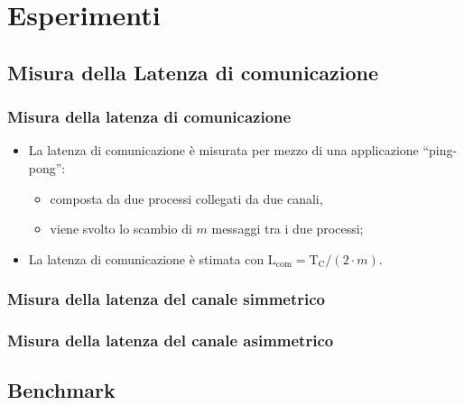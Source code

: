 \documentclass{beamer}
\newcommand{\Lcom}{\mathrm{L}_{\mathrm{com}}}
\newcommand{\Tc}{\mathrm{T}_{\mathrm{C}}}
\begin{document}
\section{Esperimenti}

\subsection{Misura della Latenza di comunicazione}

\begin{frame}
  \frametitle{Misura della latenza di comunicazione}
  \begin{itemize}
  \item La latenza di comunicazione \`e misurata per mezzo di una applicazione ``ping-pong'':
    \begin{itemize}
    \item composta da due processi collegati da due canali,
    \item viene svolto lo scambio di $m$ messaggi tra i due processi;
    \end{itemize}
  \item La latenza di comunicazione \`e stimata con $\Lcom = \Tc / (2 \cdot m)$.
  \end{itemize}
  \begin{figure}
  \end{figure}
\end{frame}

\begin{frame}
  \frametitle{Misura della latenza del canale simmetrico}
  \begin{figure}
    \resizebox{!}{2.7in}{}
  \end{figure}
\end{frame}

\begin{frame}
  \frametitle{Misura della latenza del canale asimmetrico}
  \begin{figure}
    \resizebox{!}{2.7in}{}
  \end{figure}
\end{frame}

\subsection{Benchmark}
\end{document}
